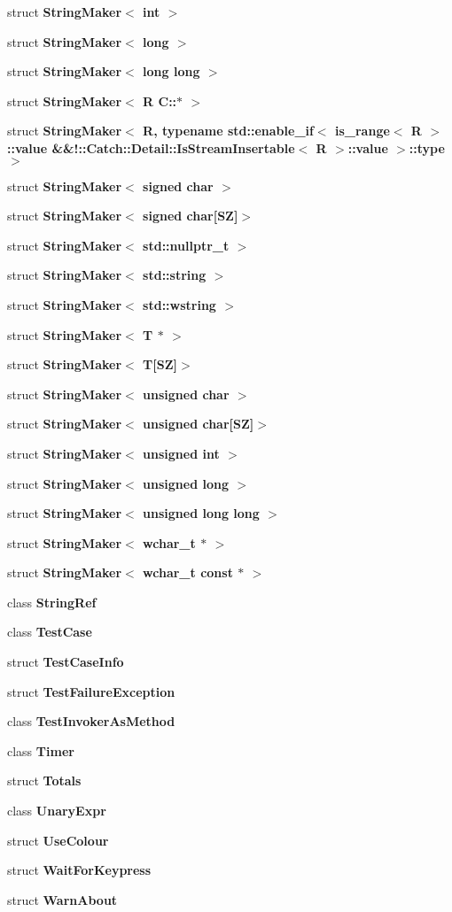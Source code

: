 \begin{DoxyCompactItemize}
\item 
struct \textbf{ String\+Maker$<$ int $>$}
\item 
struct \textbf{ String\+Maker$<$ long $>$}
\item 
struct \textbf{ String\+Maker$<$ long long $>$}
\item 
struct \textbf{ String\+Maker$<$ R C\+::$\ast$ $>$}
\item 
struct \textbf{ String\+Maker$<$ R, typename std\+::enable\+\_\+if$<$ is\+\_\+range$<$ R $>$\+::value \&\&!\+::\+Catch\+::\+Detail\+::\+Is\+Stream\+Insertable$<$ R $>$\+::value $>$\+::type $>$}
\item 
struct \textbf{ String\+Maker$<$ signed char $>$}
\item 
struct \textbf{ String\+Maker$<$ signed char[\+S\+Z]$>$}
\item 
struct \textbf{ String\+Maker$<$ std\+::nullptr\+\_\+t $>$}
\item 
struct \textbf{ String\+Maker$<$ std\+::string $>$}
\item 
struct \textbf{ String\+Maker$<$ std\+::wstring $>$}
\item 
struct \textbf{ String\+Maker$<$ T $\ast$ $>$}
\item 
struct \textbf{ String\+Maker$<$ T[\+S\+Z]$>$}
\item 
struct \textbf{ String\+Maker$<$ unsigned char $>$}
\item 
struct \textbf{ String\+Maker$<$ unsigned char[\+S\+Z]$>$}
\item 
struct \textbf{ String\+Maker$<$ unsigned int $>$}
\item 
struct \textbf{ String\+Maker$<$ unsigned long $>$}
\item 
struct \textbf{ String\+Maker$<$ unsigned long long $>$}
\item 
struct \textbf{ String\+Maker$<$ wchar\+\_\+t $\ast$ $>$}
\item 
struct \textbf{ String\+Maker$<$ wchar\+\_\+t const $\ast$ $>$}
\item 
class \textbf{ String\+Ref}
\item 
class \textbf{ Test\+Case}
\item 
struct \textbf{ Test\+Case\+Info}
\item 
struct \textbf{ Test\+Failure\+Exception}
\item 
class \textbf{ Test\+Invoker\+As\+Method}
\item 
class \textbf{ Timer}
\item 
struct \textbf{ Totals}
\item 
class \textbf{ Unary\+Expr}
\item 
struct \textbf{ Use\+Colour}
\item 
struct \textbf{ Wait\+For\+Keypress}
\item 
struct \textbf{ Warn\+About}
\end{DoxyCompactItemize}
